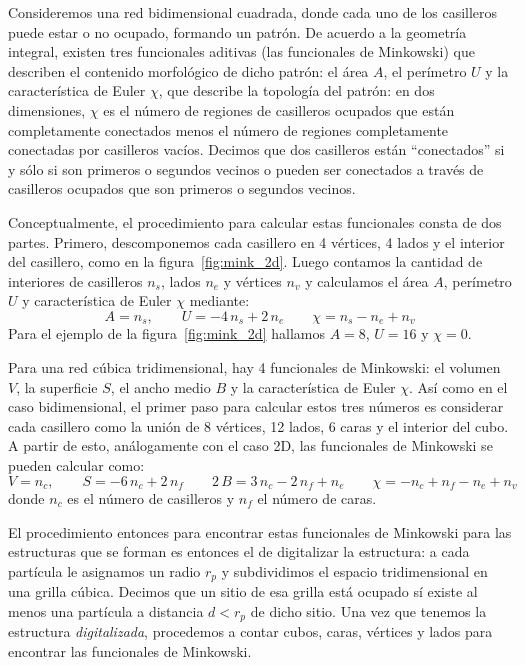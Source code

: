 Consideremos una red bidimensional cuadrada, donde cada uno de los casilleros puede estar o no ocupado, formando un patrón.
De acuerdo a la geometría integral, existen tres funcionales aditivas (las funcionales de Minkowski) que describen el contenido morfológico de dicho patrón: el área $A$, el perímetro $U$ y la característica de Euler $\chi$, que describe la topología del patrón: en dos dimensiones, $\chi$ es el número de regiones de casilleros ocupados que están completamente conectados menos el número de regiones completamente conectadas por casilleros vacíos. Decimos que dos casilleros están ``conectados'' si y sólo si son primeros o segundos vecinos o pueden ser conectados a través de casilleros ocupados que son primeros o segundos vecinos.

Conceptualmente, el procedimiento para calcular estas funcionales consta de dos partes. Primero, descomponemos cada casillero en 4 vértices, 4 lados y el interior del casillero, como en la figura~\ref{fig:mink_2d}. Luego contamos la cantidad de interiores de casilleros $n_s$, lados $n_e$ y vértices $n_v$ y calculamos el área $A$, perímetro $U$ y característica de Euler $\chi$ mediante:
\begin{equation}
A = n_s, \qquad U = -4\,n_s + 2\,n_e \qquad \chi = n_s - n_e + n_v
\end{equation}
Para el ejemplo de la figura~\ref{fig:mink_2d} hallamos $A = 8$, $U = 16$ y $\chi = 0$.

Para una red cúbica tridimensional, hay 4 funcionales de Minkowski: el volumen $V$, la superficie $S$, el ancho medio $B$ y la característica de Euler $\chi$.
Así como en el caso bidimensional, el primer paso para calcular estos tres números es considerar cada casillero como la unión de 8 vértices, 12 lados, 6 caras y el interior del cubo.
A partir de esto, análogamente con el caso 2D, las funcionales de Minkowski se pueden calcular como:
\begin{equation}
V = n_c, \qquad S = -6\,n_c + 2\,n_f \qquad 2\,B = 3\,n_c - 2\,n_f + n_e \qquad \chi = -n_c + n_f - n_e + n_v
\end{equation}
donde $n_c$ es el número de casilleros y $n_f$ el número de caras.

El procedimiento entonces para encontrar estas funcionales de Minkowski para las estructuras que se forman es entonces el de digitalizar la estructura: a cada partícula le asignamos un radio $r_p$ y subdividimos el espacio tridimensional en una grilla cúbica.
Decimos que un sitio de esa grilla está ocupado sí existe al menos una partícula a distancia $d<r_p$ de dicho sitio.
Una vez que tenemos la estructura \emph{digitalizada}, procedemos a contar cubos, caras, vértices y lados para encontrar las funcionales de Minkowski.